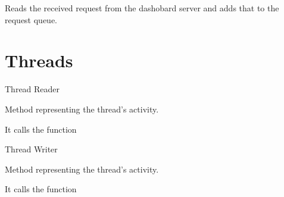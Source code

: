 \documentclass[letterpaper,10pt,english]{sphinxmanual}
\begin{document}
\begin{fulllineitems}
\label{\detokenize{index:request.request}}
Reads the received request from the dashobard server and adds that to the request queue.

\end{fulllineitems}



\chapter{Threads}
\label{\detokenize{index:module-threads}}\label{\detokenize{index:threads}}

\begin{fulllineitems}
\label{\detokenize{index:threads.Reader}}
Thread Reader

\begin{fulllineitems}
\label{\detokenize{index:threads.Reader.run}}
Method representing the thread’s activity.

It calls the function 

\end{fulllineitems}


\end{fulllineitems}


\begin{fulllineitems}
\label{\detokenize{index:threads.Writer}}
Thread Writer

\begin{fulllineitems}
\label{\detokenize{index:threads.Writer.run}}
Method representing the thread’s activity.

It calls the function 

\end{fulllineitems}


\end{fulllineitems}
\end{document}
